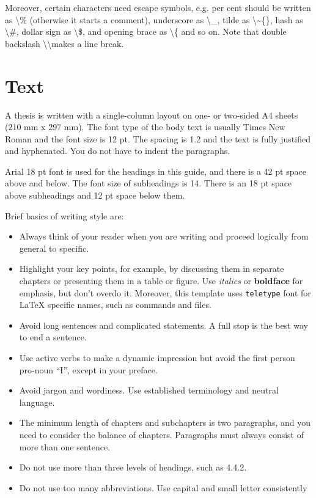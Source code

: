 \documentclass[12pt,a4paper,finnish]{tutthesis}
\begin{document}
Moreover, certain characters need escape symbols, e.g. per cent should
be written as \textbackslash\% (otherwise it starts a comment),
underscore as \textbackslash\_, tilde as \textbackslash\~{}\{\}, hash
as \textbackslash\#, dollar sign as \textbackslash\$, and opening
brace as \textbackslash\{ and so on. Note that double backslash
\textbackslash\textbackslash makes a line break.

\section{Text}
A thesis is written with a single-column layout on one- or two-sided
A4 sheets (210 mm x 297 mm). The font type of the body text is usually
Times New Roman and the font size is 12 pt. The spacing is 1.2 and the
text is fully justified and hyphenated. You do not have to indent the
paragraphs.

Arial 18 pt font is used for the headings in this guide, and there is
a 42 pt space above and below. The font size of subheadings is
14. There is an 18 pt space above subheadings and 12 pt space below
them.

Brief basics of writing style are:
\begin{itemize}
\item Always think of your reader when you are writing and proceed
  logically from general to specific.
\item Highlight your key points, for example, by discussing them in
  separate chapters or presenting them in a table or figure. Use
  \textit{italics} or \textbf{boldface} for emphasis, but don't overdo
  it.  Moreover, this template uses \texttt{teletype} font for LaTeX
  specific names, such as commands and files.
\item Avoid long sentences and complicated statements. A full stop is
  the best way to end a sentence.
\item Use active verbs to make a dynamic impression but avoid the
  first person pro-noun ``I'', except in your preface.
\item Avoid jargon and wordiness. Use established terminology and
  neutral language.
\item The minimum length of chapters and subchapters is two
  paragraphs, and you need to consider the balance of
  chapters. Paragraphs must always consist of more than one sentence.
\item Do not use more than three levels of headings, such as 4.4.2.
\item Do not use too many abbreviations. Use capital and small letter
  consistently
\end{itemize}
\end{document}
